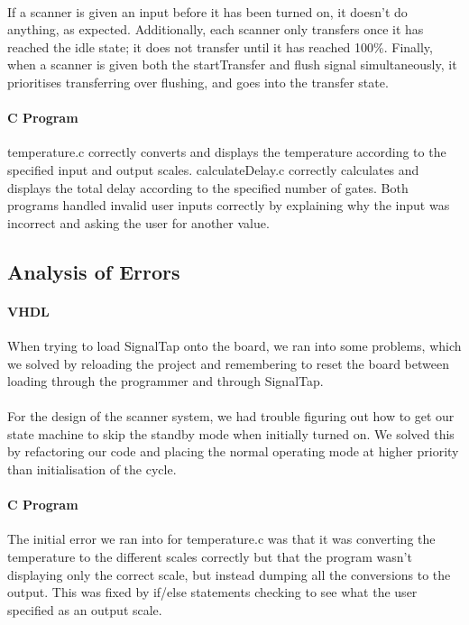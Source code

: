 \documentclass{article}
\begin{document}
  \paragraph{} If a scanner is given an input before it has been turned on, it doesn’t do anything, as expected. Additionally, each scanner only transfers once it has reached the idle state; it does not transfer until it has reached 100\%. Finally, when a scanner is given both the startTransfer and flush signal simultaneously, it prioritises transferring over flushing, and goes into the transfer state.

  \paragraph{C Program} temperature.c correctly converts and displays the temperature according to the specified input and output scales. calculateDelay.c correctly calculates and displays the total delay according to the specified number of gates. Both programs handled invalid user inputs correctly by explaining why the input was incorrect and asking the user for another value. 


  \subsection{Analysis of Errors}
  \paragraph{VHDL} When trying to load SignalTap onto the board, we ran into some problems, which we solved by reloading the project and remembering to reset the board between loading through the programmer and through SignalTap.

  \paragraph{} For the design of the scanner system, we had trouble figuring out how to get our state machine to skip the standby mode when initially turned on. We solved this by refactoring our code and placing the normal operating mode at higher priority than initialisation of the cycle.

  \paragraph{C Program} The initial error we ran into for temperature.c was that it was converting the temperature to the different scales correctly but that the program wasn’t displaying only the correct scale, but instead dumping all the conversions to the output. This was fixed by if/else statements checking to see what the user specified as an output scale.
\end{document}
